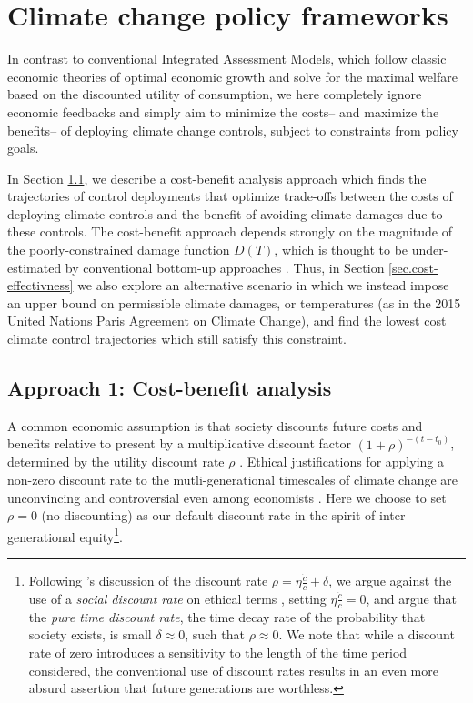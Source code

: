 \documentclass{article}
\begin{document}
\section{Climate change policy frameworks}\label{sec.policy_frameworks}

In contrast to conventional Integrated Assessment Models, which follow classic economic theories of optimal economic growth and solve for the maximal welfare based on the discounted utility of consumption, we here completely ignore economic feedbacks and simply aim to minimize the costs– and maximize the benefits– of deploying climate change controls, subject to constraints from policy goals.

In Section \ref{sec.cost_benefit}, we describe a cost-benefit analysis approach which finds the trajectories of control deployments that optimize trade-offs between the costs of deploying climate controls and the benefit of avoiding climate damages due to these controls. The cost-benefit approach depends strongly on the magnitude of the poorly-constrained damage function $D(T)$, which is thought to be under-estimated by conventional bottom-up approaches \citep{ackerman_limitations_2009}. Thus, in Section \ref{sec.cost-effectivness} we also explore an alternative scenario in which we instead impose an upper bound on permissible climate damages, or temperatures (as in the 2015 United Nations Paris Agreement on Climate Change), and find the lowest cost climate control trajectories which still satisfy this constraint.

\subsection{Approach 1: Cost-benefit analysis}\label{sec.cost_benefit}

A common economic assumption is that society discounts future costs and benefits relative to present by a multiplicative discount factor $(1 + \rho)^{-(t-t_{0})}$, determined by the utility discount rate $\rho$ \citep[e.g. see reviews in][]{broome_discounting_1994, stern_economics_2007}. Ethical justifications for applying a non-zero discount rate to the mutli-generational timescales of climate change are unconvincing and controversial even among economists \citep{ramsey_mathematical_1928, solow_economics_1974, stern_economics_2007}. Here we choose to set $\rho = 0$ (no discounting) as our default discount rate in the spirit of inter-generational equity\footnote{Following \cite{stern_economics_2007}'s discussion of the discount rate $\rho = \eta \frac{\dot{c}}{c} + \delta$, we argue against the use of a \textit{social discount rate} on ethical terms \citep{ramsey_mathematical_1928, solow_economics_1974}, setting $\eta \frac{\dot{c}}{c}=0$, and argue that the \textit{pure time discount rate}, the time decay rate of the probability that society exists, is small $\delta \approx 0$, such that $\rho \approx 0$. We note that while a discount rate of zero introduces a sensitivity to the length of the time period considered, the conventional use of discount rates results in an even more absurd assertion that future generations are worthless.}. 
\end{document}
